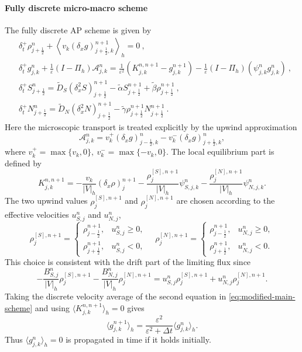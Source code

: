 \documentclass[11pt,twoside]{article}
\numberwithin{equation}{section}
\theoremstyle{plain}
\theoremstyle{nonumberplain}
\newif\ifrevisionred
\DeclareRobustCommand{\st}[1]{{\ifrevisionred\color{red}\fi #1}}
\begin{document}
{\paragraph{Fully discrete micro-macro scheme}
The fully discrete AP scheme is given by
\begin{subequations}\label{eq:modified-main-scheme}
\begin{align}
&
\delta_t^+\rho_{j+\frac12}^n
+
\left\langle
v_k(\delta_x g)_{j+\frac12,k}^{n+1}
\right\rangle_h
=0\ ,\label{eq:modified-main-scheme1}
\\[1mm]
&
\delta_t^+ g_{j,k}^n
+
\frac1\varepsilon
(I-\Pi_h)\mathcal A_{j,k}^n
=
\frac1{\varepsilon^2}
\left(
K_{j,k}^{n,n+1}
-
g_{j,k}^{n+1}
\right)
-
\frac1\varepsilon
(I-\Pi_h)(\psi_{j,k}^n g_{j,k}^n)\ ,\label{eq:modified-main-scheme2}
\\[1mm]
&
\delta_t^+S_{j+\frac12}^{n}
=
\st{\widetilde D_S(\delta_x^2S)_{j+\frac12}^{n+1}
-\widetilde\alpha S_{j+\frac12}^{n+1}
+\widetilde\beta\rho_{j+\frac12}^{n+1}}\ ,\label{eq:modified-main-scheme3}
\\[1mm]
&
\delta_t^+N_{j+\frac12}^{n}
=
\st{\widetilde D_N(\delta_x^2N)_{j+\frac12}^{n+1}
-\widetilde\gamma\rho_{j+\frac12}^{n+1}N_{j+\frac12}^{n+1}}\ .\label{eq:modified-main-scheme4}
\end{align}
\end{subequations}
Here the microscopic transport is treated explicitly by the upwind
approximation
\[
\mathcal A_{j,k}^n
=
v_k^+(\delta_x g)_{j-\frac12,k}^{n}
-
v_k^-(\delta_x g)_{j+\frac12,k}^{n},
\]
where
$
v_k^+=\max\{v_k,0\},
\
v_k^-=\max\{-v_k,0\}.
$
The local equilibrium part is defined by
\begin{equation}\label{eq:modified-K-two-upwind}
K_{j,k}^{n,n+1}
=
-\frac{v_k}{|V|_h}(\delta_x\rho)_j^{n+1}
-
\frac{\rho_j^{[S],n+1}}{|V|_h}\psi_{S,j,k}^n
-
\frac{\rho_j^{[N],n+1}}{|V|_h}\psi_{N,j,k}^n .
\end{equation}
The two upwind values $\rho_j^{[S],n+1}$ and $\rho_j^{[N],n+1}$ are chosen according to the effective velocities
\(u_{S,j}^n\) and \(u_{N,j}^n\),
\begin{equation}\label{eq: upwind densities}
\rho_j^{[S],n+1}
=
\begin{cases}
\rho_{j-\frac12}^{n+1}, & u_{S,j}^n\ge 0,\\
\rho_{j+\frac12}^{n+1}, & u_{S,j}^n<0,
\end{cases}
\quad 
\rho_j^{[N],n+1}
=
\begin{cases}
\rho_{j-\frac12}^{n+1}, & u_{N,j}^n\ge 0,\\
\rho_{j+\frac12}^{n+1}, & u_{N,j}^n<0.
\end{cases}
\end{equation}
This choice is consistent with the drift part of the limiting flux since
\[
-\frac{B_{S,j}^n}{|V|_h}\rho_j^{[S],n+1}
-
\frac{B_{N,j}^n}{|V|_h}\rho_j^{[N],n+1}
=
u_{S,j}^n\rho_j^{[S],n+1}
+
u_{N,j}^n\rho_j^{[N],n+1}.
\]
Taking the
discrete velocity average of the second equation in
\eqref{eq:modified-main-scheme} and using
$
\langle K_{j,k}^{n,n+1}\rangle_h=0
$
gives
\[
\langle g_{j,k}^{n+1}\rangle_h
=
\frac{\varepsilon^2}{\varepsilon^2+\Delta t}
\langle g_{j,k}^{n}\rangle_h .
\]
Thus \(\langle g_{j,k}^{n}\rangle_h=0\) is propagated in time if it holds
initially.

}
\end{document}
